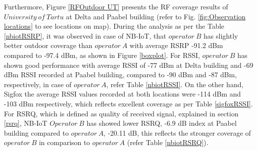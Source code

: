 \documentclass[12pt]{article}
\begin{document}
Furthermore, Figure \ref{RFOutdoor UT} presents the RF coverage results of $University\ of\  Tartu$ at Delta and Paabel building (refer to Fig. \ref{fig:Observation locations} to see locations on map). During the analysis as per the Table \ref{nbiotRSRP}, it was observed in case of NB-IoT, that $operator\ B$ has slightly better outdoor coverage than $operator\ A $ with average RSRP -91.2 dBm compared to -97.4 dBm, as shown in Figure \ref{boxplot}. For RSSI, $operator\ B$ has shown good performance with average RSSI of -77 dBm at Delta building and -69 dBm RSSI recorded at Paabel building, compared to -90 dBm and -87 dBm, respectively, in case of $operator\ A$, refer Table \ref{nbiotRSSI}. On the other hand, Sigfox the average RSSI values recorded at both locations were -114 dBm and -103 dBm respectively, which reflects excellent coverage as per Table \ref{sigfoxRSSI}. For RSRQ, which is defined as quality of received signal, explained in section \ref{rsrq}, NB-IoT $Operator\ B$ has showed lower RSRQ, -6.9 dB index at Paabel building compared to $operator\ A$, -20.11 dB, this reflects the stronger coverage of $operator\ B$ in comparison to $operator\ A$ (refer Table \ref{nbiotRSRQ}). \par



\end{document}
